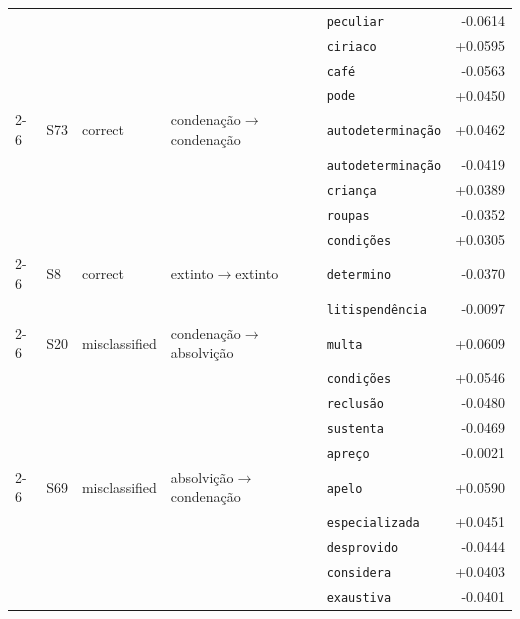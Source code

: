 \begin{table}[htbp]
{\begin{tabular}{llllp{5cm}r}
 &  &  &  & \texttt{peculiar} & -0.0614 \\
 &  &  &  & \texttt{ciriaco} & +0.0595 \\
 &  &  &  & \texttt{café} & -0.0563 \\
 &  &  &  & \texttt{pode} & +0.0450 \\
\cmidrule(lr){2-6}
 & S73 & correct & condenação$\rightarrow$condenação & \texttt{autodeterminação} & +0.0462 \\
 &  &  &  & \texttt{autodeterminação} & -0.0419 \\
 &  &  &  & \texttt{criança} & +0.0389 \\
 &  &  &  & \texttt{roupas} & -0.0352 \\
 &  &  &  & \texttt{condições} & +0.0305 \\
\cmidrule(lr){2-6}
 & S8 & correct & extinto$\rightarrow$extinto & \texttt{determino} & -0.0370 \\
 &  &  &  & \texttt{litispendência} & -0.0097 \\
\cmidrule(lr){2-6}
 & S20 & misclassified & condenação$\rightarrow$absolvição & \texttt{multa} & +0.0609 \\
 &  &  &  & \texttt{condições} & +0.0546 \\
 &  &  &  & \texttt{reclusão} & -0.0480 \\
 &  &  &  & \texttt{sustenta} & -0.0469 \\
 &  &  &  & \texttt{apreço} & -0.0021 \\
\cmidrule(lr){2-6}
 & S69 & misclassified & absolvição$\rightarrow$condenação & \texttt{apelo} & +0.0590 \\
 &  &  &  & \texttt{especializada} & +0.0451 \\
 &  &  &  & \texttt{desprovido} & -0.0444 \\
 &  &  &  & \texttt{considera} & +0.0403 \\
 &  &  &  & \texttt{exaustiva} & -0.0401 \\
\bottomrule
\end{tabular}}
\end{table}